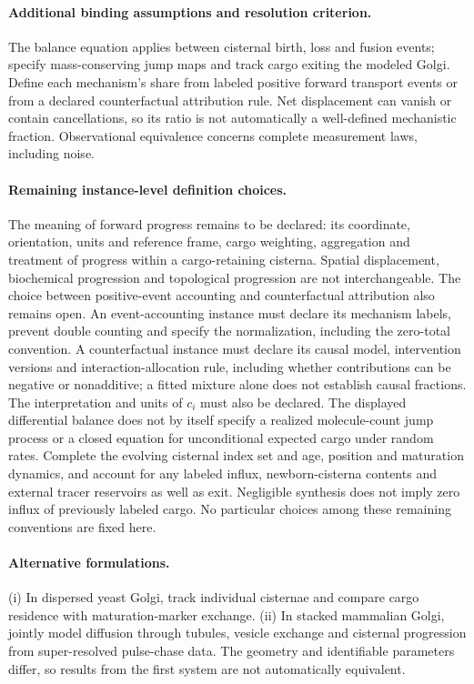 \documentclass[11pt]{article}
\begin{document}
\paragraph{Additional binding assumptions and resolution criterion.} The balance equation applies between cisternal birth, loss and fusion events; specify mass-conserving jump maps and track cargo exiting the modeled Golgi. Define each mechanism's share from labeled positive forward transport events or from a declared counterfactual attribution rule. Net displacement can vanish or contain cancellations, so its ratio is not automatically a well-defined mechanistic fraction. Observational equivalence concerns complete measurement laws, including noise.
\paragraph{Remaining instance-level definition choices.} The meaning of forward progress remains to be declared: its coordinate, orientation, units and reference frame, cargo weighting, aggregation and treatment of progress within a cargo-retaining cisterna. Spatial displacement, biochemical progression and topological progression are not interchangeable. The choice between positive-event accounting and counterfactual attribution also remains open. An event-accounting instance must declare its mechanism labels, prevent double counting and specify the normalization, including the zero-total convention. A counterfactual instance must declare its causal model, intervention versions and interaction-allocation rule, including whether contributions can be negative or nonadditive; a fitted mixture alone does not establish causal fractions. The interpretation and units of $c_i$ must also be declared. The displayed differential balance does not by itself specify a realized molecule-count jump process or a closed equation for unconditional expected cargo under random rates. Complete the evolving cisternal index set and age, position and maturation dynamics, and account for any labeled influx, newborn-cisterna contents and external tracer reservoirs as well as exit. Negligible synthesis does not imply zero influx of previously labeled cargo. No particular choices among these remaining conventions are fixed here.

\paragraph{Alternative formulations.} (i) In dispersed yeast Golgi, track individual cisternae and compare cargo residence with maturation-marker exchange. (ii) In stacked mammalian Golgi, jointly model diffusion through tubules, vesicle exchange and cisternal progression from super-resolved pulse-chase data. The geometry and identifiable parameters differ, so results from the first system are not automatically equivalent.
\end{document}
